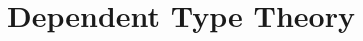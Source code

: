 \chapter{Dependent Type Theory}
{

\newcommand{\production}{\vcentcolon\vcentcolon=}

\newcommand{\mkbox}[1]{\ensuremath{#1}}

\newcommand{\Prod}[2]{\displaystyle\prod _{#1}~#2}
\newcommand{\Sum}[2]{\displaystyle\sum _{#1}~#2}

\newcommand{\app}{\mathsf{app}}

\newcommand{\gothic}{\mathfrak}
\newcommand{\gP}{{\gothic p}}
\newcommand{\gM}{{\gothic M}}
\newcommand{\gN}{{\gothic N}}
\newcommand{\rats}{\mathbb{Q}}
\newcommand{\ints}{\mathbb{Z}}







\newcommand{\lbr}{\lbrack\!\lbrack}
\newcommand{\rbr}{\rbrack\!\rbrack}
\newcommand{\sem}[2] {\lbr #1 \rbr_{#2}}  %
\newcommand{\APP}[2] {{\sf app}(#1,#2)}  %
\newcommand{\nats}{\mathbb{N}}
\newcommand{\Con}{{\sf Con}}
\newcommand{\myType}{{\sf Type}}
\newcommand{\Elem}{{\sf Elem}}
\newcommand{\myId}{1}
\newcommand{\mypp}{{\sf p}}
\newcommand{\qq}{{\sf q}}
\newcommand{\mySp}{{\sf Sp}}

\newcommand{\conv}{~{\sf conv}~}
\newcommand{\SUP}{{\sf sup}}
\newcommand{\PAIR}{{\sf pair}}
\newcommand{\mysuc}{{\sf s}}
\newcommand{\myUU}{{\sf U}}
\newcommand{\WW}{{\sf W}}
\newcommand{\NN}{{\sf N}}
\newcommand{\Ord}{{\sf Ord}}
\newcommand{\LIM}{{\sf lim}}
\newcommand{\nn}{{\sf n}}
\newcommand{\myzero}{{\sf 0}}

}
